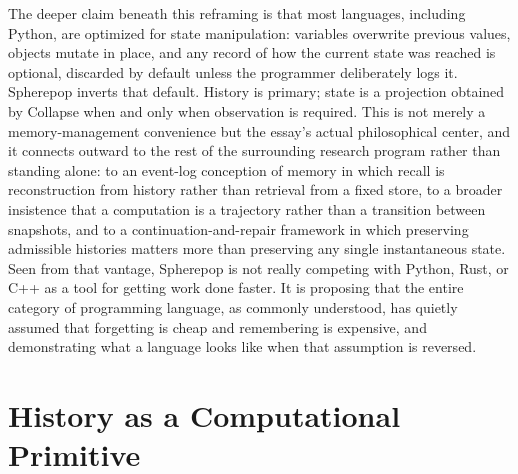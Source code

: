 \documentclass[11pt]{article}
\begin{document}
The deeper claim beneath this reframing is that most languages, including Python, are optimized for state manipulation: variables overwrite previous values, objects mutate in place, and any record of how the current state was reached is optional, discarded by default unless the programmer deliberately logs it. Spherepop inverts that default. History is primary; state is a projection obtained by Collapse when and only when observation is required. This is not merely a memory-management convenience but the essay's actual philosophical center, and it connects outward to the rest of the surrounding research program rather than standing alone: to an event-log conception of memory in which recall is reconstruction from history rather than retrieval from a fixed store, to a broader insistence that a computation is a trajectory rather than a transition between snapshots, and to a continuation-and-repair framework in which preserving admissible histories matters more than preserving any single instantaneous state. Seen from that vantage, Spherepop is not really competing with Python, Rust, or C++ as a tool for getting work done faster. It is proposing that the entire category of programming language, as commonly understood, has quietly assumed that forgetting is cheap and remembering is expensive, and demonstrating what a language looks like when that assumption is reversed.

\section{History as a Computational Primitive}
\end{document}
